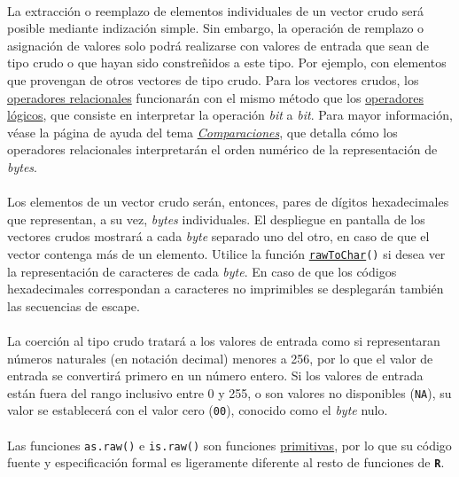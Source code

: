 \documentclass{article}[letter, 12pt]
\def\code#1{\texttt{#1}}
\def\codename#1{\textbf{\texttt{\color{gray}#1}}}
\begin{document}
\paragraph{}La extracción o reemplazo de elementos individuales de un vector crudo será posible mediante indización simple. Sin embargo, la operación de remplazo o asignación de valores solo podrá realizarse con valores de entrada que sean de tipo crudo o que hayan sido constreñidos a este tipo. Por ejemplo, con elementos que provengan de otros vectores de tipo crudo. Para los vectores crudos, los \href{run:/typeof.pdf}{operadores relacionales} funcionarán con el mismo método que los \href{run:/typeof.pdf}{operadores lógicos}, que consiste en interpretar la operación \textit{bit} a \textit{bit}. Para mayor información, véase la página de ayuda del tema \href{run:/typeof.pdf}{\textit{Comparaciones}}, que detalla cómo los operadores relacionales interpretarán el orden numérico de la representación de \textit{bytes}.\par

\paragraph{}Los elementos de un vector crudo serán, entonces, pares de dígitos hexadecimales que representan, a su vez, \textit{bytes} individuales. El despliegue en pantalla de los vectores crudos mostrará a cada \textit{byte} separado uno del otro, en caso de que el vector contenga más de un elemento. Utilice la función \code{\href{run:/typeof.pdf}{rawToChar}()} si desea ver la representación de caracteres de cada \textit{byte}. En caso de que los códigos hexadecimales correspondan a caracteres no imprimibles se desplegarán también las secuencias de escape.\par

\paragraph{}La coerción al tipo crudo tratará a los valores de entrada como si representaran números naturales (en notación decimal) menores a 256, por lo que el valor de entrada se convertirá primero en un número entero. Si los valores de entrada están fuera del rango inclusivo entre 0 y 255, o son valores no disponibles (\code{NA}), su valor se establecerá con el valor cero (\code{00}), conocido como el \textit{byte} nulo.\par

\paragraph{}Las funciones \code{as.raw()} e \code{is.raw()} son funciones \href{run:/typeof.pdf}{primitivas}, por lo que su código fuente y especificación formal es ligeramente diferente al resto de funciones de \codename{R}.\par
\end{document}
